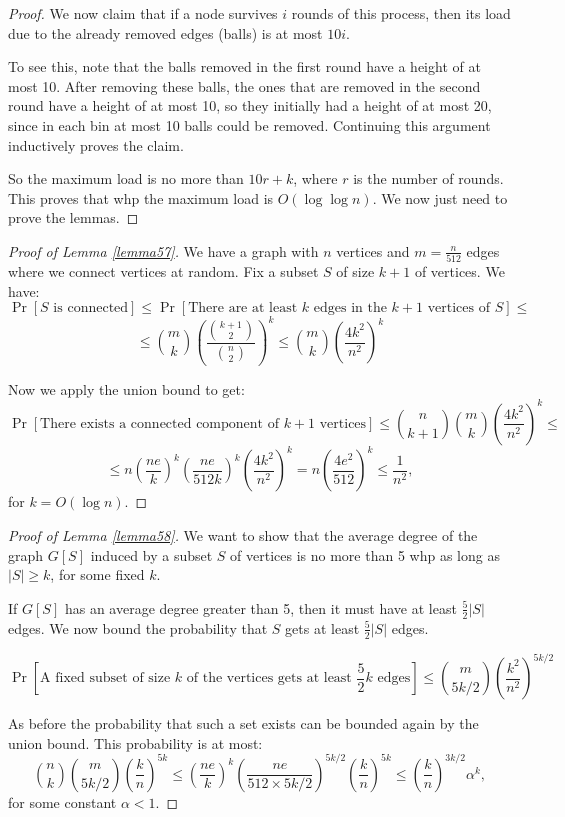 \begin{proof}
We now claim that if a node survives $i$ rounds of this process, then its load due to the already removed edges (balls) is at most $10i$. 

To see this, note that the balls removed in the first round have a height of at most 10. After removing these balls, the ones that are removed in the second round have a height of at most 10, so they initially had a height of at most 20, since in each bin at most 10 balls could be removed. Continuing this argument inductively proves the claim.

So the maximum load is no more than $10r + k$, where $r$ is the number of rounds. This proves that whp the maximum load is $O(\log \log n)$. We now just need to prove the lemmas.

\end{proof}

\begin{proof}[Proof of Lemma \ref{lemma57}]
We have a graph with $n$ vertices and $m = \frac{n}{512}$ edges where we connect vertices at random. Fix a subset $S$ of size $k+1$ of vertices. We have:
$$
\Pr[S\text{ is connected}] \leq \Pr[\text{There are at least } k \text{ edges in the } k+1 \text{ vertices of } S] \leq
$$
$$
\leq \binom{m}{k} \left(\frac{\binom{k+1}{2}}{\binom{n}{2}}\right)^k \leq \binom{m}{k} \left( \frac{4k^2}{n^2} \right)^k
$$

Now we apply the union bound to get:
$$
\Pr[\text{There exists a connected component of } k+1 \text{ vertices}] \leq \binom{n}{k+1} \binom{m}{k} \left( \frac{4k^2}{n^2} \right)^k \leq$$ $$\leq n \left(\frac{ne}{k} \right)^k \left(\frac{ne}{512k} \right)^k \left(\frac{4k^2}{n^2} \right)^k = n \left(\frac{4e^2}{512} \right)^k \leq \frac{1}{n^2},
$$
for $k = O(\log n)$.

\end{proof}

\begin{proof}[Proof of Lemma \ref{lemma58}]
We want to show that the average degree of the graph $G[S]$ induced by a subset $S$ of vertices is no more than 5 whp as long as $\vert S \vert \geq k$, for some fixed $k$.

If $G[S]$ has an average degree greater than 5, then it must have at least $\frac{5}{2}\vert S \vert$ edges. We now bound the probability that $S$ gets at least $\frac{5}{2}\vert S \vert$ edges.

$$
\Pr[\text{A fixed subset of size } k \text{ of the vertices gets at least } \frac{5}{2}k \text{ edges}] \leq \binom{m}{5k/2} \left( \frac{k^2}{n^2}\right)^{5k/2}
$$

As before the probability that such a set exists can be bounded again by the union bound. This probability is at most:
$$\binom{n}{k} \binom{m}{5k/2} \left( \frac{k}{n}\right)^{5k} \leq
\left( \frac{ne}{k} \right)^k \left( \frac{ne}{512 \times 5k/2} \right)^{5k/2} \left( \frac{k}{n} \right)^{5k} \leq \left( \frac{k}{n} \right)^{3k/2} \alpha^k,
$$
for some constant $\alpha < 1$.

\end{proof}
